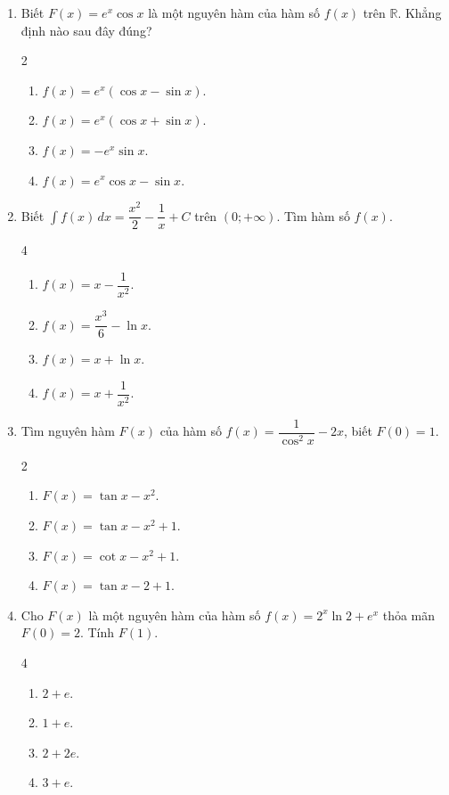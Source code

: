 \documentclass[12pt]{article}
\begin{document}
\begin{enumerate}[label=\textbf{Câu \arabic*.}]
		\item Biết $F(x) = e^x \cos x$ là một nguyên hàm của hàm số $f(x)$ trên $\mathbb{R}$. Khẳng định nào sau đây đúng?
		\begin{multicols}{2}
			\begin{enumerate}[label=\textbf{\Alph*.}]
				\item $f(x) = e^x(\cos x - \sin x)$.
				\item $f(x) = e^x(\cos x + \sin x)$.
				\item $f(x) = -e^x \sin x$.
				\item $f(x) = e^x \cos x - \sin x$.
			\end{enumerate}
		\end{multicols}
		
		\item Biết $\displaystyle \int f(x) \,dx = \dfrac{x^2}{2} - \dfrac{1}{x} + C$ trên $(0; +\infty)$. Tìm hàm số $f(x)$.
		\begin{multicols}{4}
			\begin{enumerate}[label=\textbf{\Alph*.}]
				
				\item $f(x) = x - \dfrac{1}{x^2}$.
				\item $f(x) = \dfrac{x^3}{6} - \ln x$.
				\item $f(x) = x + \ln x$.
				\item $f(x) = x + \dfrac{1}{x^2}$.
			\end{enumerate}
		\end{multicols}
		
		\item Tìm nguyên hàm $F(x)$ của hàm số $f(x) = \dfrac{1}{\cos^2 x} - 2x$, biết $F(0) = 1$.
		\begin{multicols}{2}
			\begin{enumerate}[label=\textbf{\Alph*.}]
				
				\item $F(x) = \tan x - x^2$.
				\item $F(x) = \tan x - x^2 + 1$.
				\item $F(x) = \cot x - x^2 + 1$.
				\item $F(x) = \tan x - 2 + 1$.
			\end{enumerate}
		\end{multicols}
		
		\item Cho $F(x)$ là một nguyên hàm của hàm số $f(x) = 2^x \ln 2 + e^x$ thỏa mãn $F(0) = 2$. Tính $F(1)$.
		\begin{multicols}{4}
			\begin{enumerate}[label=\textbf{\Alph*.}]
				\item $2 + e$.
				\item $1 + e$.
				\item $2 + 2e$.
				\item $3 + e$.
			\end{enumerate}
		\end{multicols}
		

\end{enumerate}
\end{document}
